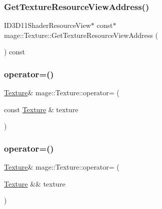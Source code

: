 \hypertarget{classmage_1_1_texture_ae7a45b80e575237d218dc9c6f059e87c}{}\label{classmage_1_1_texture_ae7a45b80e575237d218dc9c6f059e87c} 
\subsubsection{\texorpdfstring{Get\+Texture\+Resource\+View\+Address()}{GetTextureResourceViewAddress()}}
{\footnotesize\ttfamily I\+D3\+D11\+Shader\+Resource\+View$\ast$ const$\ast$ mage\+::\+Texture\+::\+Get\+Texture\+Resource\+View\+Address (\begin{DoxyParamCaption}{ }\end{DoxyParamCaption}) const}

\hypertarget{classmage_1_1_texture_a0b73b4df98d729c8f60e58b0ca065636}{}\label{classmage_1_1_texture_a0b73b4df98d729c8f60e58b0ca065636} 
\subsubsection{\texorpdfstring{operator=()}{operator=()}\hspace{0.1cm}{\footnotesize\ttfamily [1/2]}}
{\footnotesize\ttfamily \hyperlink{classmage_1_1_texture}{Texture}\& mage\+::\+Texture\+::operator= (\begin{DoxyParamCaption}\item[{const \hyperlink{classmage_1_1_texture}{Texture} \&}]{texture }\end{DoxyParamCaption})\hspace{0.3cm}{\ttfamily [delete]}}

\hypertarget{classmage_1_1_texture_a765e9cf3bddedbe2795dea0fe57245ff}{}\label{classmage_1_1_texture_a765e9cf3bddedbe2795dea0fe57245ff} 
\subsubsection{\texorpdfstring{operator=()}{operator=()}\hspace{0.1cm}{\footnotesize\ttfamily [2/2]}}
{\footnotesize\ttfamily \hyperlink{classmage_1_1_texture}{Texture}\& mage\+::\+Texture\+::operator= (\begin{DoxyParamCaption}\item[{\hyperlink{classmage_1_1_texture}{Texture} \&\&}]{texture }\end{DoxyParamCaption})\hspace{0.3cm}{\ttfamily [delete]}}



